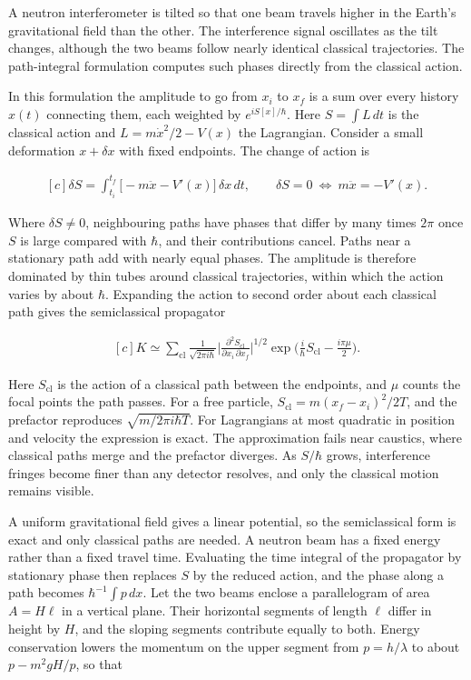 \documentclass[11pt,oneside]{book}
\newenvironment{centeredalign}{\[\begin{gathered}[c]}{\end{gathered}\]}
\begin{document}
\label{topic:path-integral-formulation}

A neutron interferometer is tilted so that one beam travels higher in the Earth's gravitational field than the other. The interference signal oscillates as the tilt changes, although the two beams follow nearly identical classical trajectories. The path-integral formulation computes such phases directly from the classical action.

In this formulation the amplitude to go from \(x_i\) to \(x_f\) is a sum over every history \(x(t)\) connecting them, each weighted by \(e^{iS[x]/\hbar}\). Here \(S=\int L\,dt\) is the classical action and \(L=m\dot x^2/2-V(x)\) the Lagrangian. Consider a small deformation \(x+\delta x\) with fixed endpoints. The change of action is

\begin{centeredalign}
\delta S=\int_{t_i}^{t_f}\big[-m\ddot x-V'(x)\big]\,\delta x\,dt,\qquad
\delta S=0\ \Longleftrightarrow\ m\ddot x=-V'(x).
\end{centeredalign}

Where \(\delta S\neq0\), neighbouring paths have phases that differ by many times \(2\pi\) once \(S\) is large compared with \(\hbar\), and their contributions cancel. Paths near a stationary path add with nearly equal phases. The amplitude is therefore dominated by thin tubes around classical trajectories, within which the action varies by about \(\hbar\). Expanding the action to second order about each classical path gives the semiclassical propagator

\begin{centeredalign}
K\simeq\sum_{\mathrm{cl}}\frac{1}{\sqrt{2\pi i\hbar}}
\Big|\frac{\partial^2S_{\mathrm{cl}}}{\partial x_i\,\partial x_f}\Big|^{1/2}
\exp\Big(\frac{i}{\hbar}S_{\mathrm{cl}}-\frac{i\pi\mu}{2}\Big).
\end{centeredalign}

Here \(S_{\mathrm{cl}}\) is the action of a classical path between the endpoints, and \(\mu\) counts the focal points the path passes. For a free particle, \(S_{\mathrm{cl}}=m(x_f-x_i)^2/2T\), and the prefactor reproduces \(\sqrt{m/2\pi i\hbar T}\). For Lagrangians at most quadratic in position and velocity the expression is exact. The approximation fails near caustics, where classical paths merge and the prefactor diverges. As \(S/\hbar\) grows, interference fringes become finer than any detector resolves, and only the classical motion remains visible.

A uniform gravitational field gives a linear potential, so the semiclassical form is exact and only classical paths are needed. A neutron beam has a fixed energy rather than a fixed travel time. Evaluating the time integral of the propagator by stationary phase then replaces \(S\) by the reduced action, and the phase along a path becomes \(\hbar^{-1}\int p\,dx\). Let the two beams enclose a parallelogram of area \(A=H\ell\) in a vertical plane. Their horizontal segments of length \(\ell\) differ in height by \(H\), and the sloping segments contribute equally to both. Energy conservation lowers the momentum on the upper segment from \(p=h/\lambda\) to about \(p-m^2gH/p\), so that
\end{document}
